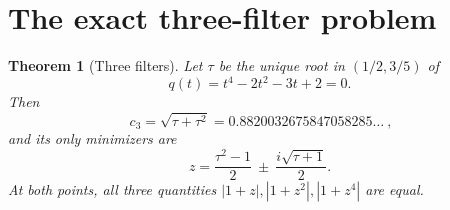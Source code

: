 \documentclass[11pt,a4paper]{article}
\newtheorem{theorem}{Theorem}[section]
\theoremstyle{definition}\newtheorem{definition}[theorem]{Definition}
\theoremstyle{remark}\newtheorem{remark}[theorem]{Remark}
\begin{document}
\section{The exact three-filter problem}\label{sec:triple}
\begin{theorem}[Three filters]\label{thm:triple}
Let $\tau$ be the unique root in $(1/2,3/5)$ of
\begin{equation}\label{eq:quartic}
q(t)=t^4-2t^2-3t+2=0.
\end{equation}
Then
\begin{equation}\label{eq:c3}
\boxed{\ c_3=\sqrt{\tau+\tau^2}=0.8820032675847058285\ldots\ },
\end{equation}
and its only minimizers are
\begin{equation}\label{eq:z3}
z=\frac{\tau^2-1}{2}\ \pm\ \frac{i\sqrt{\tau+1}}2.
\end{equation}
At both points, all three quantities $|1+z|,|1+z^2|,|1+z^4|$ are equal.
\end{theorem}
\end{document}
